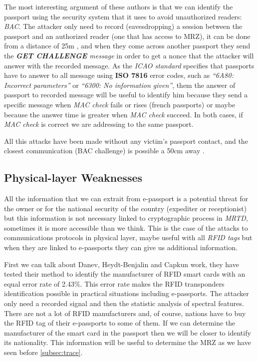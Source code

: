 \documentclass{acm_proc_article-sp}
\begin{document}
The most interesting argument of these authors \cite{CHTOM2010} is that we can identify the passport using the 
security system that it uses to avoid unauthorized readers: \textit{BAC}. The attacker only need to record 
(eavesdropping) a session between the passport and an authorized reader (one that has access to MRZ), 
it can be done from a distance of 25m \cite{02COPA}, and when they come across another passport they send 
the \textit{\textbf{GET CHALLENGE} message} in order to get a nonce that the attacker will answer with the recorded message. 
As the \textit{ICAO standard} specifies that passports have to answer to all message using \textbf{ISO 7816} error codes, 
such as \textit{``6A80: Incorrect parameters''} or \textit{``6300: No information given''}, them the answer of passport to 
recorded message will be useful to identify him because they send a specific message when \textit{MAC check} 
fails or rises  (french passports) or maybe because the answer time is greater when \textit{MAC check} succeed. 
In both cases, if \textit{MAC check} is correct we are addressing to the same passport.

All this attacks have been made without any victim’s passport contact, and the closest communication 
(BAC challenge) is possible a 50cm away \cite{CHTOM2010}.

\subsection{Physical-layer Weaknesses}
\label{subsec:phy}
All the information that we can extrait from e-passport is a potential threat for the owner or for 
the national security of the country (expediter or receptionist) but this information is not necessary 
linked to cryptographic process in \textit{MRTD}, sometimes it is more accessible than we think. This is the 
case of the attacks to communications protocols in physical layer, maybe useful with all \textit{RFID tags} 
but when they are linked to e-passports they can give us additional information.

First we can talk about Danev, Heydt-Benjalin and Capkun \cite{05DABO2009} work, they have tested their method 
to identify the manufacturer of RFID smart cards with an equal error rate of 2.43\%. This error rate 
makes the RFID transponders identification possible in practical situations including e-passports. 
The attacker only need a recorded signal and then the statistic analysis of spectral features. 
There are not a lot of RFID manufacturers and, of course, nations have to buy the RFID tag of their 
e-passports to some of them. If we can determine the manufacturer of the smart card in the passport 
then we will be closer to identify its nationality. This information will be useful to determine the 
MRZ as we have seen before \ref{subsec:trace}.
\end{document}
